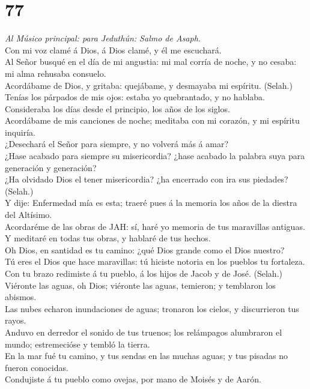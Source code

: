 \hypertarget{section-76}{%
\section{77}\label{section-76}}

 \emph{Al Músico principal: para Jeduthún: Salmo de
Asaph.}\\
Con mi voz clamé á Dios, á Dios clamé, y él me escuchará.\\
 Al Señor busqué en el día de mi angustia: mi mal corría de
noche, y no cesaba: mi alma rehusaba consuelo.\\
 Acordábame de Dios, y gritaba: quejábame, y desmayaba mi
espíritu. (Selah.)\\
 Tenías los párpados de mis ojos: estaba yo quebrantado, y
no hablaba.\\
 Consideraba los días desde el principio, los años de los
siglos.\\
 Acordábame de mis canciones de noche; meditaba con mi
corazón, y mi espíritu inquiría.\\
 ¿Desechará el Señor para siempre, y no volverá más á
amar?\\
 ¿Hase acabado para siempre su misericordia? ¿hase acabado
la palabra suya para generación y generación?\\
 ¿Ha olvidado Dios el tener misericordia? ¿ha encerrado con
ira sus piedades? (Selah.)\\
 Y dije: Enfermedad mía es esta; traeré pues á la memoria
los años de la diestra del Altísimo.\\
 Acordaréme de las obras de JAH: sí, haré yo memoria de tus
maravillas antiguas.\\
 Y meditaré en todas tus obras, y hablaré de tus hechos.\\
 Oh Dios, en santidad es tu camino: ¿qué Dios grande como
el Dios nuestro?\\
 Tú eres el Dios que hace maravillas: tú hiciste notoria en
los pueblos tu fortaleza.\\
 Con tu brazo redimiste á tu pueblo, á los hijos de Jacob y
de José. (Selah.)\\
 Viéronte las aguas, oh Dios; viéronte las aguas, temieron;
y temblaron los abismos.\\
 Las nubes echaron inundaciones de aguas; tronaron los
cielos, y discurrieron tus rayos.\\
 Anduvo en derredor el sonido de tus truenos; los
relámpagos alumbraron el mundo; estremecióse y tembló la tierra.\\
 En la mar fué tu camino, y tus sendas en las muchas aguas;
y tus pisadas no fueron conocidas.\\
 Condujiste á tu pueblo como ovejas, por mano de Moisés y
de Aarón.

